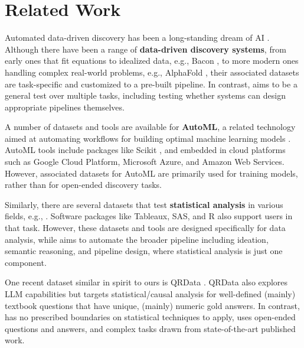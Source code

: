 \section{Related Work}
\label{sec:related_work}


Automated data-driven discovery has been a long-standing dream of AI \cite{majumder2024data,kitano2016artificial}.
Although there have been a range of {\bf data-driven discovery systems},
from early ones that fit equations to idealized data, e.g., Bacon \citep{Langley1981DataDrivenDO},
to more modern ones handling complex real-world problems, e.g., AlphaFold \cite{jumper2021highly},
their associated datasets are task-specific and customized to a
pre-built pipeline. In contrast, \discoverybench{} aims to be a general
test over multiple tasks, including testing whether systems can
design appropriate pipelines themselves.

A number of datasets and tools are available for {\bf AutoML}, a related
technology aimed at automating workflows for building optimal machine
learning models \cite{Jin2023AutoKerasAA,Zhang2023AutoMLGPTAM,LeDell2020H2OAS}.
AutoML tools include packages like Scikit \cite{feurer2015efficient},
and embedded in cloud platforms such as Google Cloud Platform,
Microsoft Azure,
and Amazon Web Services.
However, associated datasets for AutoML are primarily used for training models,
rather than for open-ended discovery tasks.

Similarly, there are several datasets that test {\bf statistical
analysis} in various fields, e.g., \cite{Shao2023ExploringPI,Li2024AutomatedSM,Yang2022ASL}.
Software packages like Tableaux, SAS, and R also support users in that task.
However, these datasets and tools are designed specifically for data analysis,
while \discoverybench{} aims to automate the broader pipeline including ideation,
semantic reasoning, and pipeline design, where statistical analysis is just one component.

One recent dataset similar in spirit to ours is QRData \cite{liu2024llms}.
QRData also explores LLM capabilities but targets statistical/causal analysis for well-defined (mainly) textbook questions that have unique, (mainly) numeric gold answers.
In contrast, \discoverybench{} has no prescribed boundaries on statistical techniques to apply,
uses open-ended questions and answers, and complex tasks drawn from state-of-the-art published work.


